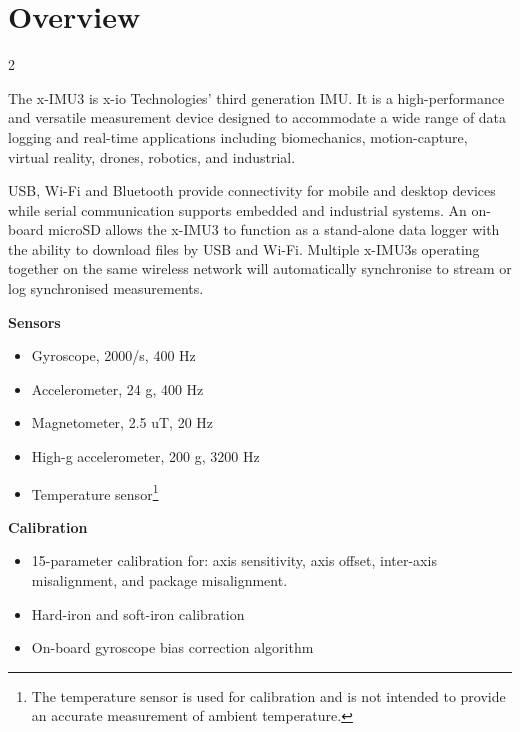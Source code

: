 \section{Overview}

\begin{multicols}{2}

The x-IMU3 is x-io Technologies' third generation \ac{IMU}.  It is a high-performance and versatile measurement device designed to accommodate a wide range of data logging and real-time applications including biomechanics, motion-capture, virtual reality, drones, robotics, and industrial.

\acs{USB}, Wi-Fi and Bluetooth provide connectivity for mobile and desktop devices while serial communication supports embedded and industrial systems.  An on-board \acs{microSD} allows the x-IMU3 to function as a stand-alone data logger with the ability to download files by \acs{USB} and Wi-Fi.  Multiple x-IMU3s operating together on the same wireless network will automatically synchronise to stream or log synchronised measurements.

\textbf{Sensors}
\begin{itemize}[nolistsep]
    \item Gyroscope, \textpm{}2000\textdegree{}/s, 400 Hz
    \item Accelerometer, \textpm{}24 g, 400 Hz
    \item Magnetometer, \textpm{}2.5 uT, 20 Hz
    \item High-g accelerometer, \textpm{}200 g, 3200 Hz
    \item Temperature sensor\footnote{The temperature sensor is used for calibration and is not intended to provide an accurate measurement of ambient temperature.}
\end{itemize}

\textbf{Calibration}
\begin{itemize}[nolistsep]
    \item 15-parameter calibration for: axis sensitivity, axis offset, inter-axis misalignment, and package misalignment.
    \item Hard-iron and soft-iron calibration
    \item On-board gyroscope bias correction algorithm
\end{itemize}


\end{multicols}
